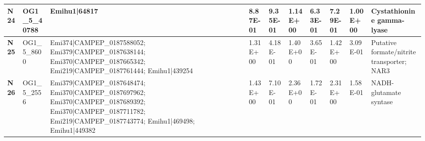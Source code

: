 \begin{landscape}
\begin{center}
\begin{footnotesize}
\begin{longtable}{|p{0.5cm}|p{1.5cm}|p{4cm}|l|l|l|l|l|l|l|}
\textbf{N24} & OG1\_5\_40788 & Emihu1|64817                                                                                                                                                                                                                                                                                                                                                                                                                                                                                                                                                                                                                             & 8.87E-01  & 9.35E-01 & 1.14E+00  & 6.33E-01 & 7.29E-01  & 1.00E+00 & Cystathionine gamma-lyase                                                    \\ \hline
\textbf{N25} & OG1\_5\_8600  & Emi374|CAMPEP\_0187588052; Emi379|CAMPEP\_0187638144; Emi370|CAMPEP\_0187665342; Emi219|CAMPEP\_0187761444; Emihu1|439254                                                                                                                                                                                                                                                                                                                                                                                                                                                                                                                & 1.31E+00  & 4.18E-01 & 1.40E+00  & 3.65E-01 & 1.42E+00  & 3.09E-01 & Putative formate/nitrite transporter; NAR3                                   \\ \hline
\textbf{N26} & OG1\_5\_2556  & Emi379|CAMPEP\_0187648474; Emi370|CAMPEP\_0187697962; Emi370|CAMPEP\_0187689392; Emi370|CAMPEP\_0187711782; Emi219|CAMPEP\_0187743774; Emihu1|469498; Emihu1|449382                                                                                                                                                                                                                                                                                                                                                                                                                                                                      & 1.43E+00  & 7.10E-01 & 2.36E+00  & 1.72E-01 & 2.31E+00  & 1.58E-01 & NADH-glutamate syntase                                                       \\ \hline

\end{longtable}
\end{footnotesize}
\end{center}
\end{landscape}
